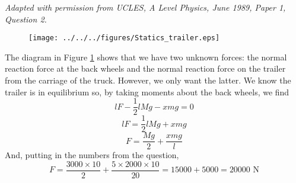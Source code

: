 
\begin{problem}[A1986PIQ2a] %
{}
{\textit{Adapted with permission from UCLES, A Level Physics, June 1989, Paper 1, Question 2.}}
{
\begin{figure} [h]
	\centering
	\texttt{[image: ../../../figures/Statics\_trailer.eps]}
	\caption{} \label{fig:Statics_trailer}
\end{figure}
The diagram in Figure \ref{fig:Statics_trailer} shows that we have two unknown forces: the normal reaction force  at the back wheels and the normal reaction force  on the trailer from the carriage of the truck. However, we only want the latter. We know the trailer is in equilibrium so, by taking moments about the back wheels, we find
\begin{equation*}
lF-\frac{1}{2}lMg-xmg=0	
\end{equation*}
\begin{equation*}
lF=\frac{1}{2}lMg+xmg	
\end{equation*}
\begin{equation*}
F=\frac{Mg}{2}+\frac{xmg}{l}	
\end{equation*}
And, putting in the numbers from the question,
\begin{equation*}
F=\frac{3000\times 10}{2}+\frac{5\times 2000\times 10}{20}=15000+5000=20000\textrm{ N}	
\end{equation*}
}
\end{problem}
